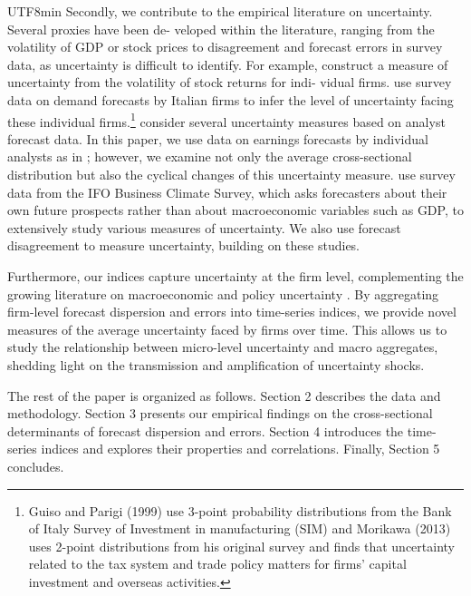 \documentclass[12pt, a4paper]{article}
\begin{document}
\begin{CJK}{UTF8}{min}
Secondly, we contribute to the empirical literature on uncertainty. Several proxies have been de-
veloped within the literature, ranging from the volatility of GDP or stock prices to disagreement
and forecast errors in survey data, as uncertainty is difficult to identify. For example, \cite{leahy1996investment} construct a measure of uncertainty from the volatility of stock returns for indi-
vidual firms. \cite{guiso1999investment} use survey data on demand forecasts by Italian firms to
infer the level of uncertainty facing these individual firms.\footnote{Guiso and Parigi (1999) use 3-point probability distributions from the Bank of Italy Survey of Investment
in manufacturing (SIM) and Morikawa (2013) uses 2-point distributions from his original survey and finds that
uncertainty related to the tax system and trade policy matters for firms' capital investment and overseas activities.}
\cite{bond2005uncertainty} consider several uncertainty measures based on analyst forecast data.
In this paper, we use data on earnings forecasts by individual analysts as in
\cite{bond2005uncertainty}; however, we examine not only the average cross-sectional distribution but
also the cyclical changes of this uncertainty measure. \cite{bachmann2013uncertainty} use survey data
from the IFO Business Climate Survey, which asks forecasters about their own future prospects
rather than about macroeconomic variables such as GDP, to extensively study various measures
of uncertainty. We also use forecast disagreement to measure uncertainty, building on these studies.

Furthermore, our indices capture uncertainty at the firm level, complementing the growing literature on macroeconomic and policy uncertainty \citep{bloom2009impact, baker2016measuring, jurado2015measuring}. By aggregating firm-level forecast dispersion and errors into time-series indices, we provide novel measures of the average uncertainty faced by firms over time. This allows us to study the relationship between micro-level uncertainty and macro aggregates, shedding light on the transmission and amplification of uncertainty shocks.

The rest of the paper is organized as follows. Section 2 describes the data and methodology. Section 3 presents our empirical findings on the cross-sectional determinants of forecast dispersion and errors. Section 4 introduces the time-series indices and explores their properties and correlations. Finally, Section 5 concludes.



\bigskip

\end{CJK}
\end{document}
